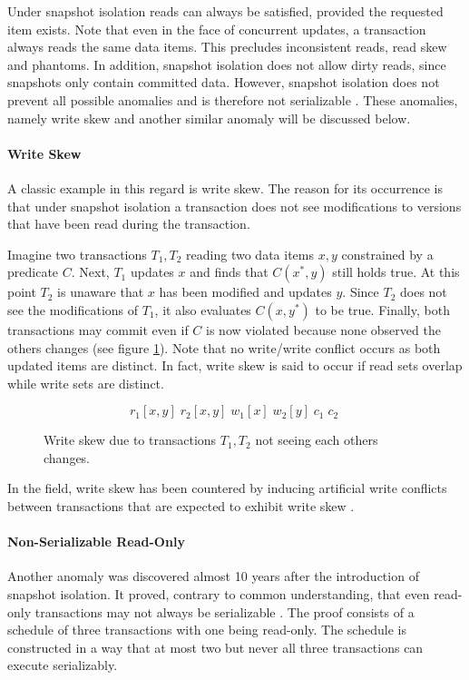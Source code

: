 Under snapshot isolation reads can always be satisfied, provided the requested
item exists. Note that even in the face of concurrent updates, a transaction
always reads the same data items. This precludes inconsistent reads, read skew
and phantoms. In addition, snapshot isolation does not allow dirty reads, since
snapshots only contain committed data. However, snapshot isolation does not
prevent all possible anomalies and is therefore not serializable
\cite{berenson1995critique}. These anomalies, namely write skew and another
similar anomaly will be discussed below.

\paragraph{Write Skew}

A classic example in this regard is write skew. The reason for its occurrence is
that under snapshot isolation a transaction does not see modifications to
versions that have been read during the transaction.

Imagine two transactions $T_1, T_2$ reading two data items $x, y$ constrained by
a predicate $C$. Next, $T_1$ updates $x$ and finds that $C(x^{*}, y)$ still
holds true. At this point $T_2$ is unaware that $x$ has been modified and
updates $y$. Since $T_2$ does not see the modifications of $T_1$, it also
evaluates $C(x, y^{*})$ to be true. Finally, both transactions may commit even
if $C$ is now violated because none observed the others changes (see figure
\ref{fig:write_skew}). Note that no write/write conflict occurs as both updated
items are distinct. In fact, write skew is said to occur if read sets overlap
while write sets are distinct.

\begin{figure}
    \centering
    \[
        r_1[x,y]\; r_2[x,y]\; w_1[x]\; w_2[y]\; c_1\; c_2\;
    \]
    \caption{Write skew due to transactions $T_1, T_2$ not seeing each others changes.}
    \label{fig:write_skew}
\end{figure}

In the field, write skew has been countered by inducing artificial write
conflicts between transactions that are expected to exhibit write skew
\cite{fekete2005making}.

\paragraph{Non-Serializable Read-Only}

Another anomaly was discovered almost 10 years after the introduction of
snapshot isolation. It proved, contrary to common understanding, that even
read-only transactions may not always be serializable \cite{fekete2004read}. The
proof consists of a schedule of three transactions with one being read-only. The
schedule is constructed in a way that at most two but never all three
transactions can execute serializably.

